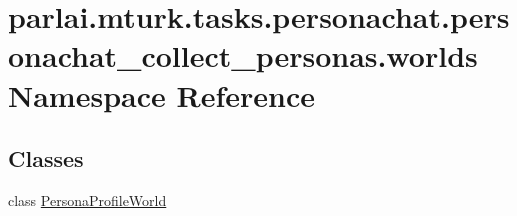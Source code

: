 \hypertarget{namespaceparlai_1_1mturk_1_1tasks_1_1personachat_1_1personachat__collect__personas_1_1worlds}{}\section{parlai.\+mturk.\+tasks.\+personachat.\+personachat\+\_\+collect\+\_\+personas.\+worlds Namespace Reference}
\label{namespaceparlai_1_1mturk_1_1tasks_1_1personachat_1_1personachat__collect__personas_1_1worlds}
\subsection*{Classes}
\begin{DoxyCompactItemize}
\item 
class \hyperlink{classparlai_1_1mturk_1_1tasks_1_1personachat_1_1personachat__collect__personas_1_1worlds_1_1PersonaProfileWorld}{Persona\+Profile\+World}
\end{DoxyCompactItemize}
